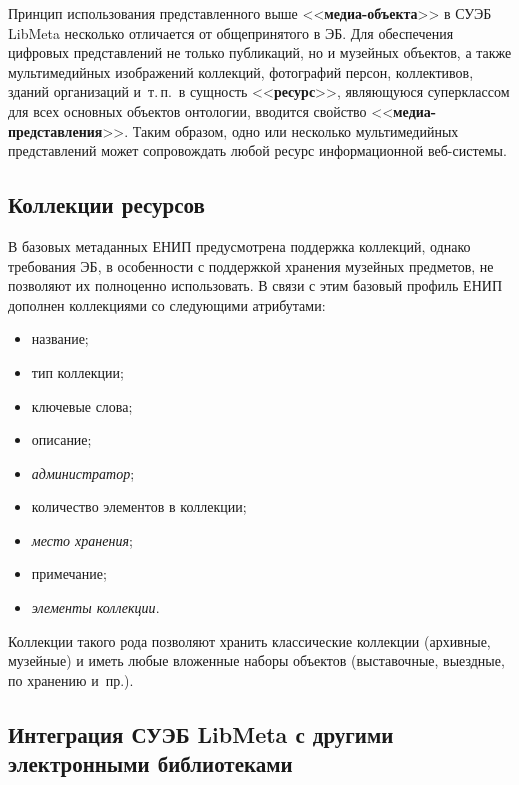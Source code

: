 \begin{multicols}{2}
  Принцип использования представленного выше <<\textbf{медиа-объекта}>> в СУЭБ 
LibMeta несколько отличается от общепринятого в ЭБ. Для обеспечения цифровых 
представлений не только публикаций, но и музейных объектов, а также мультимедийных 
изображений коллекций, фотографий персон, коллективов, зданий организаций и~т.\,п.\ в 
сущность <<\textbf{ресурс}>>, являющуюся суперклассом для всех основных объектов 
онтологии, вводится свойство <<\textbf{ме\-диа-пред\-став\-ле\-ния}>>. Таким образом, одно или 
несколько мультимедийных представлений может сопровождать любой ресурс 
информационной веб-системы.

\vspace*{-6pt}
  
  \subsection*{Коллекции ресурсов}
  
  В базовых метаданных ЕНИП предусмотрена поддержка коллекций, однако требования 
ЭБ, в особенности с поддержкой хранения музейных предметов, не позволяют их 
полноценно использовать. В связи с этим базовый профиль ЕНИП дополнен коллекциями со 
следующими атрибутами:

\noindent
  \begin{itemize}
\item название; 
\item тип коллекции;
\item ключевые слова;
\item описание;\
\item \textit{администратор};
\item количество элементов в коллекции;
\item \textit{место хранения};
\item примечание;
\item \textit{элементы коллекции}.
\end{itemize}

  Коллекции такого рода позволяют хранить классические коллекции (архивные, музейные) 
и иметь любые вложенные наборы объектов (выставочные, выездные, по хранению и~пр.).


\subsection{Интеграция СУЭБ LibMeta с другими электронными библиотеками}
  

\end{multicols}
